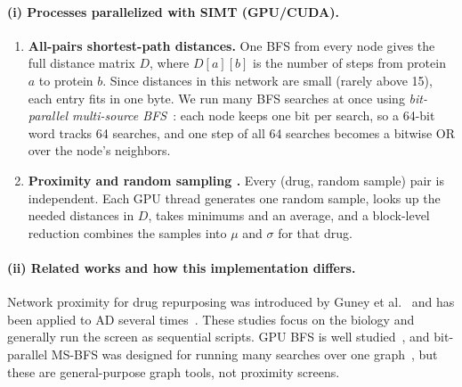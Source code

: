 \paragraph{(i) Processes parallelized with SIMT (GPU/CUDA).}
\begin{enumerate}
  \item \textbf{All-pairs shortest-path distances.} One BFS from every node gives the full distance matrix $D$, where $D[a][b]$ is the number of steps from protein $a$ to protein $b$. Since distances in this network are small (rarely above 15), each entry fits in one byte. We run many BFS searches at once using \emph{bit-parallel multi-source BFS}~\cite{then2014more}: each node keeps one bit per search, so a 64-bit word tracks 64 searches, and one step of all 64 searches becomes a bitwise OR over the node's neighbors.
  \item \textbf{Proximity and random sampling .} Every (drug, random sample) pair is independent. Each GPU thread generates one random sample, looks up the needed distances in $D$, takes minimums and an average, and a block-level reduction combines the samples into $\mu$ and $\sigma$ for that drug.
\end{enumerate}

\paragraph{(ii) Related works and how this implementation differs.}
Network proximity for drug repurposing was introduced by Guney et al.~\cite{guney2016network} and has been applied to AD several times~\cite{fang2021endophenotype,csbj2023proximity,lqt2025proximity}. These studies focus on the biology and generally run the screen as sequential scripts. GPU BFS is well studied~\cite{harish2007accelerating,merrill2012scalable,wang2016gunrock}, and bit-parallel MS-BFS was designed for running many searches over one graph~\cite{then2014more}, but these are general-purpose graph tools, not proximity screens. 


